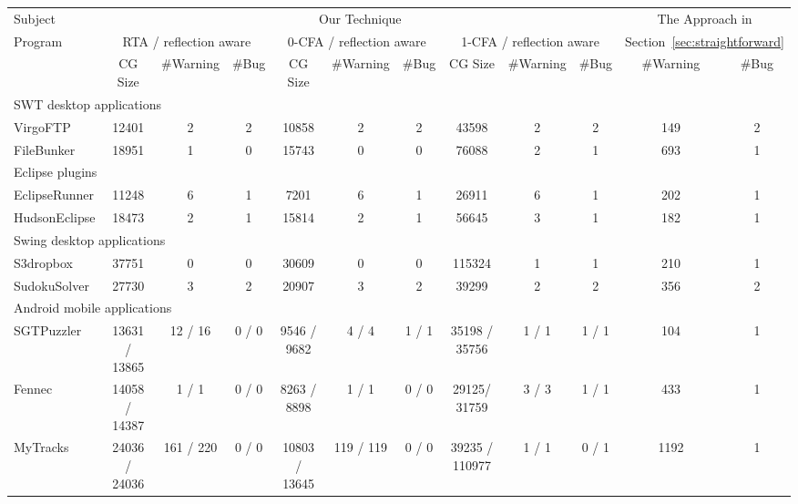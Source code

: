 \begin{table*}[ht]
\begin{center}
 \fontsize{9pt}{\baselineskip}\selectfont
\hspace*{-0.2cm}
\setlength{\tabcolsep}{.35\tabcolsep}
\begin{tabular}{|l||c|c|c||c|c|c||c|c|c||c|c|}
\hline
 Subject&  \multicolumn{9}{|c||}{Our Technique} & \multicolumn{2}{|c|}{The Approach in}  \\
\cline{2-10}
 Program  &  \multicolumn{3}{|c|}{RTA / reflection aware}& \multicolumn{3}{|c|}{0-CFA / reflection aware} & \multicolumn{3}{|c||}{1-CFA / reflection aware} & \multicolumn{2}{|c|}{Section~\ref{sec:straightforward}}  \\
\cline{2-12}
 & CG Size & \#Warning & \#Bug & CG Size & \#Warning & \#Bug & CG Size & \#Warning & \#Bug & \#Warning & \#Bug\\
\hline \hline
\multicolumn{12}{|l|}{SWT desktop applications}   \\
 \hline
 VirgoFTP&  12401 &  2 &  2 & 10858 & 2 & 2 & 43598 & 2 & 2& 149 & 2 \\
 \hline
 FileBunker &  18951 &  1 &  0 & 15743 & 0 & 0 & 76088 & 2 & 1& 693 & 1 \\
 \hline
 \hline
\multicolumn{12}{|l|}{Eclipse plugins}   \\
 \hline
 EclipseRunner&  11248&  6 &  1 & 7201 & 6 & 1 & 26911 & 6 & 1& 202 & 1 \\
 \hline
 HudsonEclipse& 18473 &  2 &  1 & 15814 & 2 & 1& 56645 & 3 & 1 & 182 & 1 \\
 \hline
 \hline
\multicolumn{12}{|l|}{Swing desktop applications}   \\
 \hline
 S3dropbox & 37751 &  0 &  0 & 30609 & 0 & 0 & 115324 & 1 & 1 & 210 & 1 \\
 \hline
  SudokuSolver&  27730&  3 &  2 & 20907 & 3 & 2 & 39299 & 2 & 2 & 356 & 2 \\
 \hline
 \hline
\multicolumn{12}{|l|}{Android mobile applications}   \\
 \hline
 SGTPuzzler & 13631 / 13865&  12 / 16 &  0 / 0 & 9546 / 9682& 4 / 4& 1 / 1 & 35198 / 35756 & 1 / 1  & 1 / 1& 104 & 1 \\
 \hline
 Fennec & 14058 / 14387 &  1 / 1 &  0 / 0 & 8263 / 8898 & 1 / 1 & 0 / 0& 29125/ 31759 & 3 / 3 & 1 / 1& 433 & 1 \\
 \hline
 MyTracks & 24036 / 24036 &  161 / 220 & 0 / 0 & 10803 / 13645 & 119 / 119 & 0 / 0 & 39235 / 110977 & 1 / 1 & 0 / 1 & 1192 & 1 \\

\end{tabular}
\end{center}
\end{table*}

